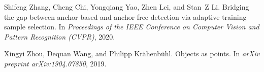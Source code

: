 \documentclass[10pt,twocolumn,letterpaper]{article}
\begin{document}
{\begin{thebibliography}{10}
	Shifeng Zhang, Cheng Chi, Yongqiang Yao, Zhen Lei, and Stan~Z Li.
	\newblock Bridging the gap between anchor-based and anchor-free detection via
	adaptive training sample selection.
	\newblock In {\em Proceedings of the IEEE Conference on Computer Vision and
		Pattern Recognition (CVPR)}, 2020.
	
	Xingyi Zhou, Dequan Wang, and Philipp Kr{\"a}henb{\"u}hl.
	\newblock Objects as points.
	\newblock In {\em arXiv preprint arXiv:1904.07850}, 2019.
	
\end{thebibliography}

}
\end{document}

